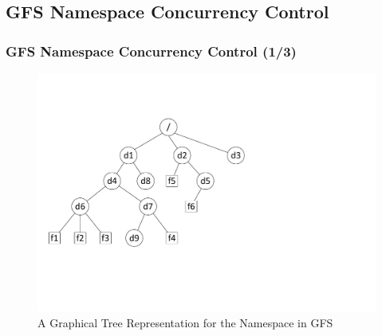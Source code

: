 \documentclass{beamer}
\begin{document}
\subsection{GFS Namespace Concurrency Control}
\begin{frame}
	\frametitle{GFS Namespace Concurrency Control (1/3)}
	\begin{figure}[ht]
		\centering
		\includegraphics[width=\linewidth]{figs/gfstree.pdf}
		\caption{A Graphical Tree Representation for the Namespace in GFS}
	\end{figure}
\end{frame}
\end{document}
